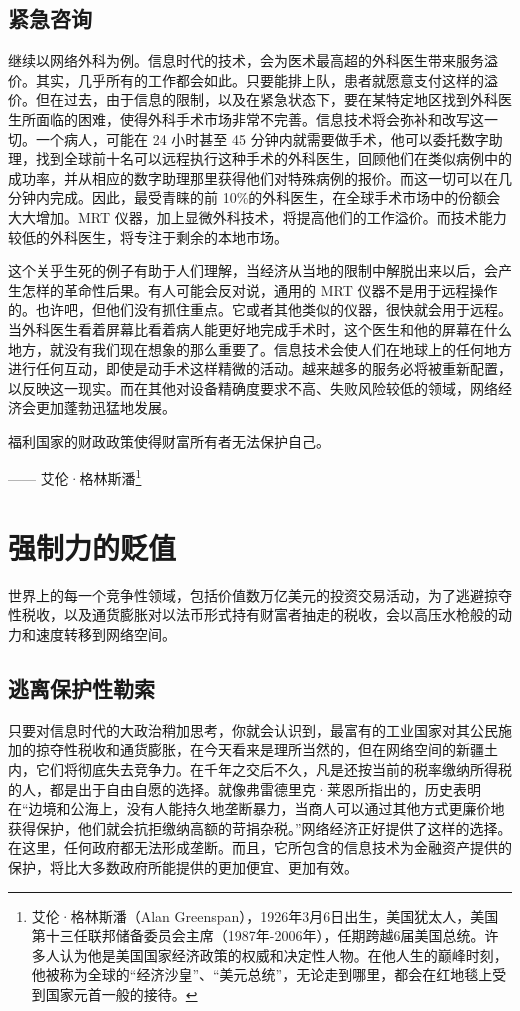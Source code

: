 \subsection{紧急咨询}
继续以网络外科为例。信息时代的技术，会为医术最高超的外科医生带来服务溢价。其实，几乎所有的工作都会如此。只要能排上队，患者就愿意支付这样的溢价。但在过去，由于信息的限制，以及在紧急状态下，要在某特定地区找到外科医生所面临的困难，使得外科手术市场非常不完善。信息技术将会弥补和改写这一切。一个病人，可能在 24 小时甚至 45 分钟内就需要做手术，他可以委托数字助理，找到全球前十名可以远程执行这种手术的外科医生，回顾他们在类似病例中的成功率，并从相应的数字助理那里获得他们对特殊病例的报价。而这一切可以在几分钟内完成。因此，最受青睐的前 10\%的外科医生，在全球手术市场中的份额会大大增加。MRT 仪器，加上显微外科技术，将提高他们的工作溢价。而技术能力较低的外科医生，将专注于剩余的本地市场。

这个关乎生死的例子有助于人们理解，当经济从当地的限制中解脱出来以后，会产生怎样的革命性后果。有人可能会反对说，通用的 MRT 仪器不是用于远程操作的。也许吧，但他们没有抓住重点。它或者其他类似的仪器，很快就会用于远程。当外科医生看着屏幕比看着病人能更好地完成手术时，这个医生和他的屏幕在什么地方，就没有我们现在想象的那么重要了。信息技术会使人们在地球上的任何地方进行任何互动，即使是动手术这样精微的活动。越来越多的服务必将被重新配置，以反映这一现实。而在其他对设备精确度要求不高、失败风险较低的领域，网络经济会更加蓬勃迅猛地发展。

\begin{tcolorbox}
\kaishu 福利国家的财政政策使得财富所有者无法保护自己。
\begin{flushright}
—— 艾伦·格林斯潘\footnote{艾伦·格林斯潘（Alan Greenspan），1926年3月6日出生，美国犹太人，美国第十三任联邦储备委员会主席（1987年-2006年），任期跨越6届美国总统。许多人认为他是美国国家经济政策的权威和决定性人物。在他人生的巅峰时刻，他被称为全球的“经济沙皇”、“美元总统”，无论走到哪里，都会在红地毯上受到国家元首一般的接待。}    
\end{flushright}
\end{tcolorbox}


\section{强制力的贬值}
世界上的每一个竞争性领域，包括价值数万亿美元的投资交易活动，为了逃避掠夺性税收，以及通货膨胀对以法币形式持有财富者抽走的税收，会以高压水枪般的动力和速度转移到网络空间。

\subsection{逃离保护性勒索}
只要对信息时代的大政治稍加思考，你就会认识到，最富有的工业国家对其公民施加的掠夺性税收和通货膨胀，在今天看来是理所当然的，但在网络空间的新疆土内，它们将彻底失去竞争力。在千年之交后不久，凡是还按当前的税率缴纳所得税的人，都是出于自由自愿的选择。就像弗雷德里克·莱恩所指出的，历史表明在“边境和公海上，没有人能持久地垄断暴力，当商人可以通过其他方式更廉价地获得保护，他们就会抗拒缴纳高额的苛捐杂税。”网络经济正好提供了这样的选择。在这里，任何政府都无法形成垄断。而且，它所包含的信息技术为金融资产提供的保护，将比大多数政府所能提供的更加便宜、更加有效。

